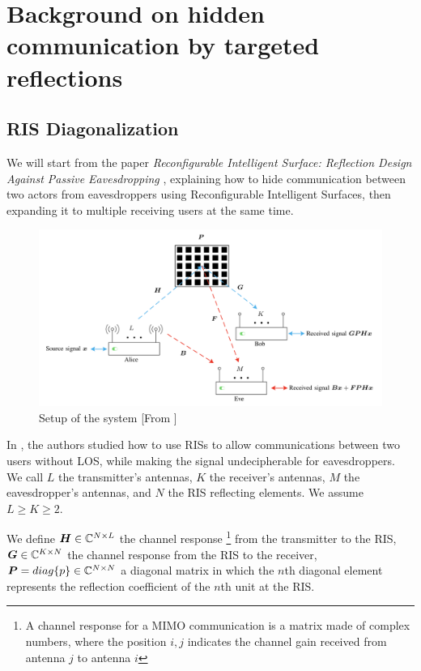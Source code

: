 \section{Background on hidden communication by targeted reflections}

\subsection{RIS Diagonalization}

We will start from the paper \textit{Reconfigurable Intelligent Surface: Reflection Design Against Passive Eavesdropping} \cite{9328149}, explaining how to hide communication between two actors from eavesdroppers using Reconfigurable Intelligent Surfaces, then expanding it to multiple receiving users at the same time.

\begin{figure}[H]
  \centering
  \includegraphics[width=\linewidth]{imgs/problem-description.png}
  \caption{Setup of the system [From \cite{9328149}]}
  \label{fig:correlation_sk}
\end{figure}

In \cite{9328149}, the authors studied how to use RISs to allow communications between two users without LOS, while making the signal undecipherable for eavesdroppers. We call $L$ the transmitter's antennas, $K$ the receiver's antennas, $M$ the eavesdropper's antennas, and $N$ the RIS reflecting elements. We assume $L \ge K \ge 2$.

We define $\bm{H} \in \mathbb{C}^{N \times L}$ the channel response \footnote{A channel response for a MIMO communication is a matrix made of complex numbers, where the position $i,j$ indicates the channel gain received from antenna $j$ to antenna $i$} from the transmitter to the RIS, $\bm{G} \in \mathbb{C}^{K \times N}$ the channel response from the RIS to the receiver, $\bm{P} = diag\{p\} \in \mathbb{C}^{N \times N}$ a diagonal matrix in which the $n$th diagonal element represents the reflection coefficient of the $n$th unit at the RIS.

